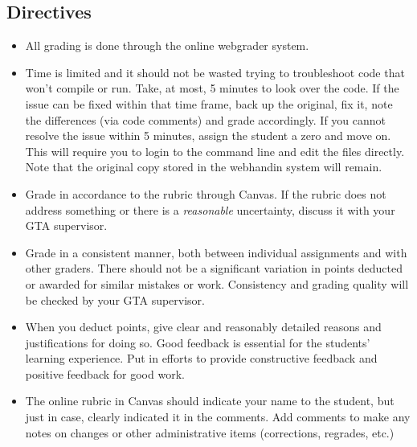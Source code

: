 \documentclass[12pt]{scrartcl}
\begin{document}
\subsection*{Directives}

\begin{itemize}
  \item All grading is done through the online webgrader system.  
  \item Time is limited and it should not be wasted trying to troubleshoot 
    code that won't compile or run.  Take, at most, 5 minutes to look over
    the code.  If the issue can be fixed within that time frame, back up the
    original, fix it, note the differences (via code comments) and grade 
    accordingly.  If you cannot resolve the issue within 5 minutes, assign
    the student a zero and move on.  This will require you to login to the
    command line and edit the files directly.  Note that the original copy
    stored in the webhandin system will remain.
  \item Grade in accordance to the rubric through Canvas.  If the rubric 
    does not address something or there is a \emph{reasonable} uncertainty, 
    discuss it with your GTA supervisor.
  \item Grade in a consistent manner, both between individual assignments and
    with other graders.  There should not be a significant variation in
    points deducted or awarded for similar mistakes or work.  Consistency 
    and grading quality will be checked by your GTA supervisor.
  \item When you deduct points, give clear and reasonably detailed reasons
    and justifications for doing so.  Good feedback is essential for the
    students' learning experience.  Put in efforts to provide constructive
    feedback and positive feedback for good work.
  \item The online rubric in Canvas should indicate your name to the student, 
    but just in case, clearly indicated it in the comments.  Add comments to
    make any notes on changes or other administrative items (corrections, 
    regrades, etc.)
\end{itemize}
\end{document}
